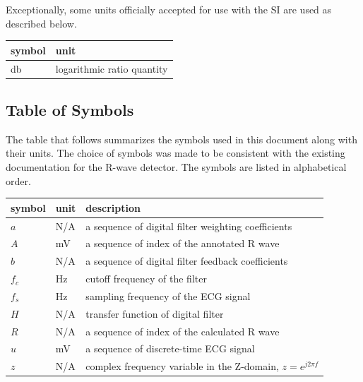 \documentclass[12pt]{article}
\begin{document}
\noindent Exceptionally, some units officially accepted for use with the SI are
used as described below.  ~\newline

\renewcommand{\arraystretch}{1.2}
  \noindent \begin{tabular}{l l} 
    \toprule		
    \textbf{symbol} & \textbf{unit}\\
    \midrule 
    \si{\decibel} & logarithmic ratio quantity\\
    \bottomrule
  \end{tabular}

\subsection{Table of Symbols}

The table that follows summarizes the symbols used in this document along with
their units.  The choice of symbols was made to be consistent with the existing
documentation for the R-wave detector.  The symbols are listed in alphabetical
order.

\renewcommand{\arraystretch}{1.2}
\noindent \begin{longtable*}{l l p{12cm}} \toprule \textbf{symbol} &
\textbf{unit} & \textbf{description}\\
\midrule 
$a$ & N/A & a sequence of digital filter weighting coefficients \\
$A$ & \si{\mV} & a sequence of index of the annotated R wave \\
$b$ & N/A & a sequence of digital filter feedback coefficients \\
$f_c$ & \si{\hertz} & cutoff frequency of the filter \\
$f_s$ & \si{\hertz} & sampling frequency of the ECG signal \\
$H$ & N/A & transfer function of digital filter \\
$R$ & N/A & a sequence of index of the calculated R wave \\
$u$ & \si{\mV} & a sequence of discrete-time ECG signal \\
$z$ & N/A & complex frequency variable in the Z-domain, $z=e^{j2\pi f}$ \\
\bottomrule
\end{longtable*}
\end{document}
